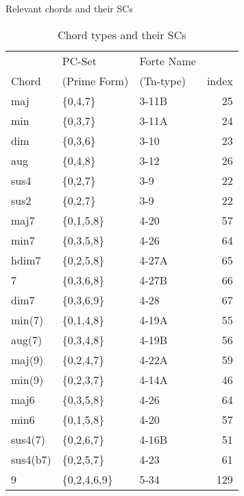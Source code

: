 \documentclass{article}
\begin{document}
Relevant chords and their SCs
\begin{table}[htb]
\caption{Chord types and their SCs} 
\begin{center}
\begin{tabular}{lllr}
\hline
             &  PC-Set                &  Forte Name  &         \\
 Chord       &  (Prime Form)          &  (Tn-type)   &  index  \\
\hline
 maj         &  \{0,4,7\}             &  3-11B       &     25  \\
 min         &  \{0,3,7\}             &  3-11A       &     24  \\
 dim         &  \{0,3,6\}             &  3-10        &     23  \\
 aug         &  \{0,4,8\}             &  3-12        &     26  \\
 sus4        &  \{0,2,7\}             &  3-9         &     22  \\
 sus2        &  \{0,2,7\}             &  3-9         &     22  \\
\hline
 maj7        &  \{0,1,5,8\}           &  4-20        &     57  \\
 min7        &  \{0,3,5,8\}           &  4-26        &     64  \\
 hdim7       &  \{0,2,5,8\}           &  4-27A       &     65  \\
 7           &  \{0,3,6,8\}           &  4-27B       &     66  \\
 dim7        &  \{0,3,6,9\}           &  4-28        &     67  \\
 min(7)      &  \{0,1,4,8\}           &  4-19A       &     55  \\
 aug(7)      &  \{0,3,4,8\}           &  4-19B       &     56  \\
 maj(9)      &  \{0,2,4,7\}           &  4-22A       &     59  \\
 min(9)      &  \{0,2,3,7\}           &  4-14A       &     46  \\
 maj6        &  \{0,3,5,8\}           &  4-26        &     64  \\
 min6        &  \{0,1,5,8\}           &  4-20        &     57  \\
 sus4(7)     &  \{0,2,6,7\}           &  4-16B       &     51  \\
 sus4(b7)    &  \{0,2,5,7\}           &  4-23        &     61  \\
\hline
 9           &  \{0,2,4,6,9\}         &  5-34        &    129  \\

\end{tabular}
\end{center}
\end{table}
\end{document}
